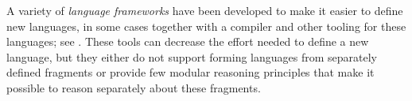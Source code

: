 \documentclass[10pt,preprint]{sigplanconf}
\begin{document}
A variety of \emph{language frameworks} have been developed to make it easier to define new languages, in some cases together with a compiler and other tooling for these languages; see \cite{erdweg2013state}. %
These tools can decrease the effort needed to define a new language, but they either do not support forming languages from separately defined fragments or provide few modular reasoning principles that make it possible to reason separately about these fragments. %
\end{document}
